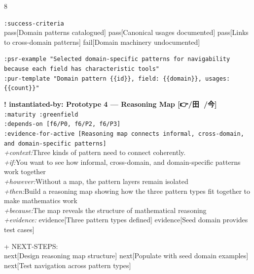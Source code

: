 \documentclass[landscape]{article}
\newcommand{\flexitag}[1]{\textcolor[gray]{0.35}{\textit{#1}}}
\newenvironment{devmapgreenfield}{%
  \def\FrameCommand{\colorbox{devmapgreenfieldbg}}%
  \setlength{\fboxsep}{2pt}%
  \MakeFramed{\advance\hsize-\width \FrameRestore}%
}{\endMakeFramed}
\begin{document}
\begin{paracol}{8}
\begin{devmapgreenfield}
\par
  \texttt{:\allowbreak{}success-\allowbreak{}criteria}\\
    pass[Domain patterns catalogued] pass[Canonical usages documented] pass[Links to cross-domain patterns] fail[Domain machinery undocumented]\\
\par
  \texttt{:\allowbreak{}psr-\allowbreak{}example "Selected domain-\allowbreak{}specific patterns for navigability because each field has characteristic tools"}\\
  \texttt{:\allowbreak{}pur-\allowbreak{}template "Domain pattern \{\{id\}\},\allowbreak{} field:\allowbreak{} \{\{domain\}\},\allowbreak{} usages:\allowbreak{} \{\{count\}\}"}\\
\par
\par
\end{devmapgreenfield}
\begin{devmapgreenfield}
\textbf{! instantiated-by: Prototype 4 — Reasoning Map [👉/田 🔺/今]}\\
  \texttt{:\allowbreak{}maturity :\allowbreak{}greenfield}\\
  \texttt{:\allowbreak{}depends-\allowbreak{}on [f6/\allowbreak{}P0,\allowbreak{} f6/\allowbreak{}P2,\allowbreak{} f6/\allowbreak{}P3]}\\
  \texttt{:\allowbreak{}evidence-\allowbreak{}for-\allowbreak{}active [Reasoning map connects informal,\allowbreak{} cross-\allowbreak{}domain,\allowbreak{} and domain-\allowbreak{}specific patterns]}\\
  \flexitag{+context:}Three kinds of pattern need to connect coherently.\\
  \flexitag{+if:}You want to see how informal, cross-domain, and domain-specific patterns work together\\
  \flexitag{+however:}Without a map, the pattern layers remain isolated\\
  \flexitag{+then:}Build a reasoning map showing how the three pattern types fit together to make mathematics work\\
  \flexitag{+because:}The map reveals the structure of mathematical reasoning\\
  \flexitag{+evidence:} evidence[Three pattern types defined] evidence[Seed domain provides test cases]\\
\par
  + NEXT-STEPS:\\
    next[Design reasoning map structure] next[Populate with seed domain examples] next[Test navigation across pattern types]\\

\end{devmapgreenfield}
\end{paracol}
\end{document}
